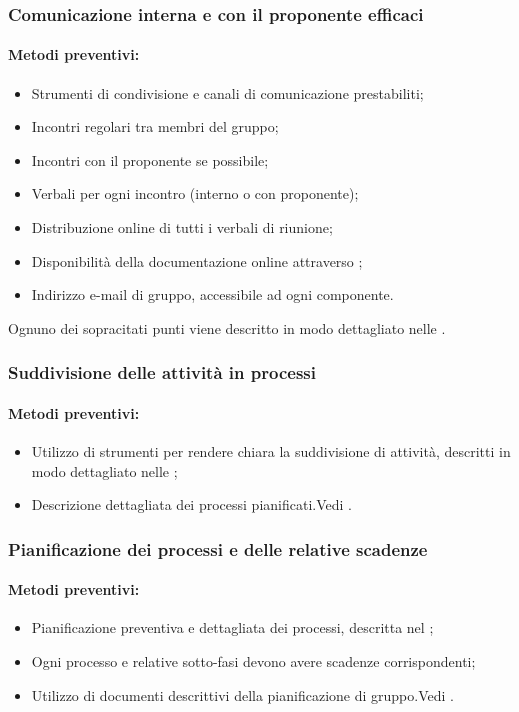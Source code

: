 \documentclass[12pt,a4paper]{article}
\begin{document}
\subsubsection{Comunicazione interna e con il proponente efficaci}
\paragraph{Metodi preventivi:}
\begin{itemize}
	\item Strumenti di condivisione e canali di comunicazione prestabiliti;
	\item Incontri regolari tra membri del gruppo;
	\item Incontri con il proponente se possibile;
	\item Verbali per ogni incontro (interno o con proponente);
	\item Distribuzione online di tutti i verbali di riunione;
	\item Disponibilità della documentazione online attraverso ;
	\item Indirizzo e-mail di gruppo, accessibile ad ogni componente.
\end{itemize}
Ognuno dei sopracitati punti viene descritto in modo dettagliato nelle \NdP{}.

\subsubsection{Suddivisione delle attività in processi}
\paragraph{Metodi preventivi:}
\begin{itemize}
	\item Utilizzo di strumenti per rendere chiara la suddivisione di attività, descritti in modo dettagliato nelle \NdP{};
	\item Descrizione dettagliata dei processi pianificati.Vedi \PdP{}.
\end{itemize}

\subsubsection{Pianificazione dei processi e delle relative scadenze}
\paragraph{Metodi preventivi:}
\begin{itemize}
	\item Pianificazione preventiva e dettagliata dei processi, descritta nel \PdP{};
	\item Ogni processo e relative sotto-fasi devono avere scadenze corrispondenti;
	\item Utilizzo di documenti descrittivi della pianificazione di gruppo.Vedi \PdP{}.
\end{itemize}
\end{document}
